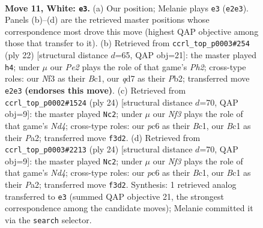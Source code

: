 \documentclass[11pt]{article}
\begin{document}
\clearpage

\begin{figure}[p]\centering
\begin{subfigure}{0.46\textwidth}\centering
\resizebox{\linewidth}{!}{%
\newchessgame
\chessboard[
  setfen={rnb1r1k1/pp1q2pp/2pbpn2/5p2/2PP4/2N2NP1/P3PPBP/R1BQR1K1 w - - 5 11},
  showmover=false,
  pgfstyle=straightmove, color=movearrow, markmove={e2-e3}
]}
\caption{}
\end{subfigure}\hfill
\begin{subfigure}{0.46\textwidth}\centering
\resizebox{\linewidth}{!}{%
\newchessgame
\chessboard[
  setfen={r2qr1k1/pbpnbp1p/1p3np1/3p4/3P4/2N2NP1/PP2PPBP/R1BQR1K1 w - - 2 12},
  showmover=false,
  pgfstyle=straightmove, color=movearrow, markmove={h2-h4}
]}
\caption{}
\end{subfigure}
\\[4pt]
\begin{subfigure}{0.46\textwidth}\centering
\resizebox{\linewidth}{!}{%
\newchessgame
\chessboard[
  setfen={r1b1r1k1/pp2qpbp/3p1np1/2p1n3/2PNP3/2N3P1/PP2QPBP/R1BR2K1 w - - 0 13},
  showmover=false,
  pgfstyle=straightmove, color=movearrow, markmove={d4-c2}
]}
\caption{}
\end{subfigure}\hfill
\begin{subfigure}{0.46\textwidth}\centering
\resizebox{\linewidth}{!}{%
\newchessgame
\chessboard[
  setfen={r1b1r1k1/pp2qpbp/3p1np1/2p1n3/2PNP3/2N3P1/PP2QPBP/R1BR2K1 w - - 0 13},
  showmover=false,
  pgfstyle=straightmove, color=movearrow, markmove={d4-c2}
]}
\caption{}
\end{subfigure}
\caption{\textbf{Move 11, White: \texttt{e3}.} (a) Our position; Melanie plays \texttt{e3} (\texttt{e2e3}). Panels (b)--(d) are the retrieved master positions whose correspondence most drove this move (highest QAP objective among those that transfer to it). (b) Retrieved from \texttt{ccrl\_top\_p0003\#254} (ply 22) [structural distance $d$=65, QAP obj=21]: the master played \texttt{h4}; under $\mu$ our \emph{Pe2} plays the role of that game's \emph{Ph2}; cross-type roles: our \emph{N}f3 as their \emph{B}c1, our \emph{q}d7 as their \emph{P}b2; transferred move \texttt{e2e3} \textbf{(endorses this move)}. (c) Retrieved from \texttt{ccrl\_top\_p0002\#1524} (ply 24) [structural distance $d$=70, QAP obj=9]: the master played \texttt{Nc2}; under $\mu$ our \emph{Nf3} plays the role of that game's \emph{Nd4}; cross-type roles: our \emph{p}c6 as their \emph{B}c1, our \emph{B}c1 as their \emph{P}a2; transferred move \texttt{f3d2}. (d) Retrieved from \texttt{ccrl\_top\_p0003\#2213} (ply 24) [structural distance $d$=70, QAP obj=9]: the master played \texttt{Nc2}; under $\mu$ our \emph{Nf3} plays the role of that game's \emph{Nd4}; cross-type roles: our \emph{p}c6 as their \emph{B}c1, our \emph{B}c1 as their \emph{P}a2; transferred move \texttt{f3d2}. Synthesis: 1 retrieved analog transferred to \texttt{e3} (summed QAP objective 21, the strongest correspondence among the candidate moves); Melanie committed it via the \texttt{search} selector.}
\label{fig:thought-m20}
\end{figure}
\end{document}
